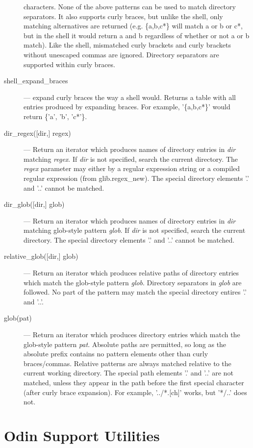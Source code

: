 \begin{description}
characters.  None of the above patterns can be used to match directory
separators.  It also supports curly braces, but unlike the shell,
only matching alternatives are returned (e.g. {\ex \{a,b,c*\}} will match
{\ex a} or {\ex b} or {\ex c*}, but in the shell it would return {\ex a} and
{\ex b} regardless of whether or not {\ex a} or {\ex b} match).  Like the
shell, mismatched curly brackets and curly brackets without unescaped commas
are ignored.  Directory separators are supported within curly braces.
\item[shell\_expand\_braces] --- expand curly braces the way a shell
would.  Returns a table with all entries produced by expanding braces.
For example, {\ex '\{a,b,c*\}'} would return {\ex \{'a', 'b', 'c*'\}}.
\item[dir\_regex({[}dir,{]} regex)] --- Return an iterator which
produces names of directory entries in \emph{dir} matching \emph{regex}.
If \emph{dir} is not specified, search the current directory.  The
\emph{regex} parameter may either by a regular expression string or a
compiled regular expression (from {\ex glib.regex\_new}).  The special
directory elements {\ex '.'} and {\ex '..'} cannot be matched.
\item[dir\_glob({[}dir,{]} glob)] --- Return an iterator which produces
names of directory entries in \emph{dir} matching glob-style pattern
\emph{glob}.  If \emph{dir} is not specified, search the current directory.
The special directory elements {\ex '.'} and {\ex '..'} cannot be matched.
\item[relative\_glob({[}dir,{]} glob)] --- Return an iterator which produces
relative paths of directory entries which match the glob-style pattern
\emph{glob}.  Directory separators in \emph{glob} are followed.  No
part of the pattern may match the special directory entires {\ex '.'} and
{\ex '..'}.
\item[glob(pat)] --- Return an iterator which produces directory entries
which match the glob-style pattern \emph{pat}.  Absolute paths are
permitted, so long as the absolute prefix contains no pattern elements
other than curly braces/commas.  Relative patterns are always matched
relative to the current working directory.  The special path elements
{\ex '.'} and {\ex '..'} are not matched, unless they appear in the path
before the first special character (after curly brace expansion).  For
example, {\ex '../*.{[}ch{]}'} works, but {\ex '*/..'} does not.
\end{description}

\section{Odin Support Utilities}


